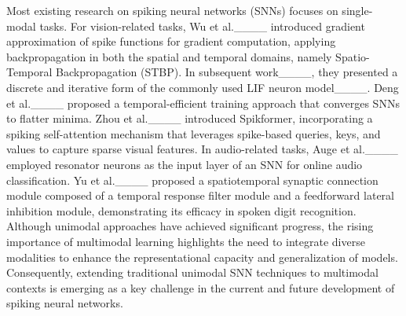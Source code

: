 
Most existing research on spiking neural networks (SNNs) focuses on single-modal tasks. 
For vision-related tasks, Wu et al.____ introduced gradient approximation of spike functions for gradient computation, applying backpropagation in both the spatial and temporal domains, namely Spatio-Temporal Backpropagation (STBP). In subsequent work____, they presented a discrete and iterative form of the commonly used LIF neuron model____. Deng et al.____ proposed a temporal-efficient training approach that converges SNNs to flatter minima. Zhou et al.____ introduced Spikformer, incorporating a spiking self-attention mechanism that leverages spike-based queries, keys, and values to capture sparse visual features.
In audio-related tasks, Auge et al.____ employed resonator neurons as the input layer of an SNN for online audio classification. Yu et al.____ proposed a spatiotemporal synaptic connection module composed of a temporal response filter module and a feedforward lateral inhibition module, demonstrating its efficacy in spoken digit recognition.
Although unimodal approaches have achieved significant progress, the rising importance of multimodal learning highlights the need to integrate diverse modalities to enhance the representational capacity and generalization of models. Consequently, extending traditional unimodal SNN techniques to multimodal contexts is emerging as a key challenge in the current and future development of spiking neural networks.

